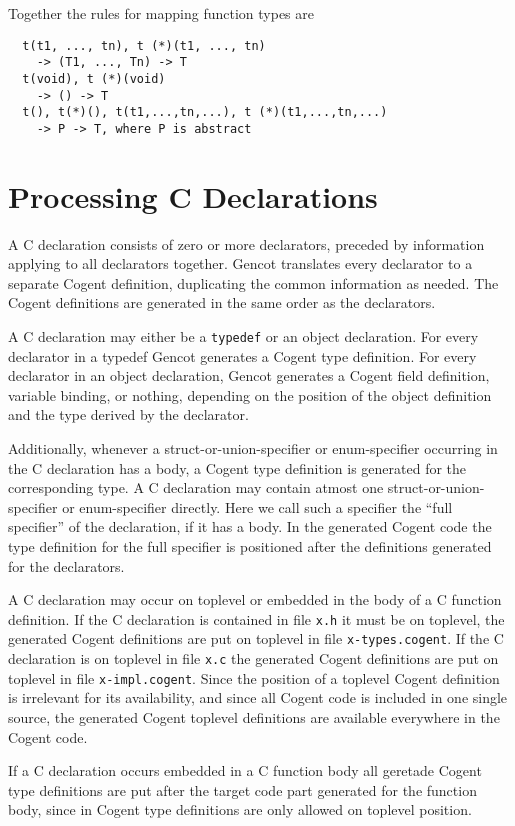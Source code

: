 \documentclass[a4paper]{report}
\newcommand{\code}[1]{\textnormal{\texttt{#1}}}
\begin{document}
Together the rules for mapping function types are
\begin{verbatim}
  t(t1, ..., tn), t (*)(t1, ..., tn) 
    -> (T1, ..., Tn) -> T
  t(void), t (*)(void) 
    -> () -> T
  t(), t(*)(), t(t1,...,tn,...), t (*)(t1,...,tn,...) 
    -> P -> T, where P is abstract
\end{verbatim}

\section{Processing C Declarations}

A C declaration consists of zero or more declarators, preceded by information applying to all declarators together.
Gencot translates every declarator to a separate Cogent definition, duplicating the common information as needed.
The Cogent definitions are generated in the same order as the declarators.

A C declaration may either be a \code{typedef} or an object declaration. For every declarator in a typedef Gencot
generates a Cogent type definition. For every declarator in an object declaration, Gencot generates a Cogent 
field definition, variable binding, or nothing, depending on the position of the object definition and the 
type derived by the declarator.

Additionally, whenever a struct-or-union-specifier or enum-specifier occurring in the C declaration has a body,
a Cogent type definition is generated for the corresponding type. A C declaration may contain atmost one 
struct-or-union-specifier or enum-specifier directly. Here we call such a specifier the ``full specifier'' of 
the declaration, if it has a body. In the generated Cogent code the type definition for the full specifier is
positioned after the definitions generated for the declarators.

A C declaration may occur on toplevel or embedded in the body of a C function definition. 
If the C declaration is contained in file \code{x.h} it must be on toplevel, the generated Cogent definitions 
are put on toplevel in file \code{x-types.cogent}.
If the C declaration is on toplevel in file \code{x.c} the generated Cogent definitions are put on toplevel
in file \code{x-impl.cogent}. 
Since the position of a toplevel Cogent definition is irrelevant for its availability, and since all Cogent
code is included in one single source, the generated Cogent toplevel definitions are available everywhere in the Cogent code.

If a C declaration occurs embedded in a C function body all geretade Cogent type definitions are put after
the target code part generated for the function body, since in Cogent type definitions are only allowed on
toplevel position. 
\end{document}
